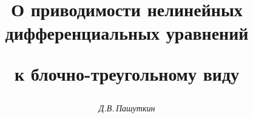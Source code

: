 






\newcommand{\Colon}{\operatorname{colon}}


\newcommand{\arctg}{\operatorname{arctg}}


\newcommand{\tts}[1]{}







\setcounter{page}{50}















\author{\it Д.В.\,Пашуткин }




\title{О приводимости нелинейных дифференциальных уравнений


к блочно-треугольному виду}





\date{}




\pagestyle{plain} %







\maketitle


\label{begin}








